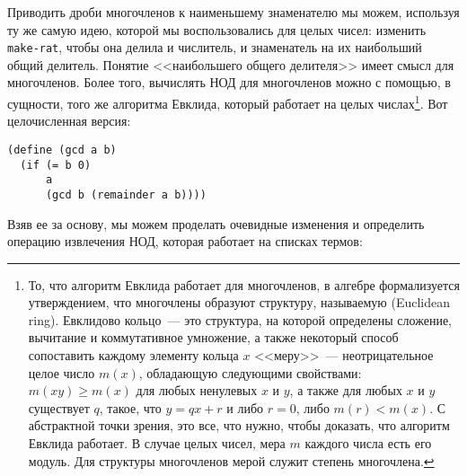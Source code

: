 Приводить дроби многочленов к наименьшему знаменателю мы
можем, используя ту же самую идею, которой мы воспользовались для
целых чисел: изменить {\tt make-rat}, чтобы она делила и числитель, и
знаменатель на их наибольший общий делитель.  Понятие  <<наибольшего
общего делителя>> имеет смысл для многочленов.  Более того, вычислять
НОД для многочленов можно с помощью, в сущности, того же алгоритма
Евклида, который работает на целых числах\footnote{То, что алгоритм Евклида 
работает для многочленов,
в алгебре формализуется утверждением, что многочлены образуют
структуру, называемую 
 (Euclidean ring).
Евклидово кольцо~---  это структура, на которой определены сложение,
вычитание и коммутативное умножение, а также некоторый способ
сопоставить каждому элементу кольца $x$ 
<<меру>>~---
неотрицательное целое число $m(x)$, обладающую
следующими свойствами: $m(xy) \ge m(x)$ для
любых ненулевых $x$ и $y$,
а также для любых $x$ и $y$
существует $q$, такое, что
$y = qx + r$ и либо $r=0$,
либо $m(r) < m(x)$.  С абстрактной точки
зрения, это все, что нужно, чтобы доказать, что алгоритм Евклида
работает.  В случае целых чисел, мера $m$ каждого
числа есть его модуль.  Для структуры многочленов мерой служит
степень многочлена.}.
Вот целочисленная версия:

\begin{Verbatim}[fontsize=\small]
(define (gcd a b)
  (if (= b 0)
      a
      (gcd b (remainder a b))))
\end{Verbatim}
Взяв ее за основу, мы можем проделать очевидные изменения и определить
операцию извлечения НОД, которая работает на списках термов:


